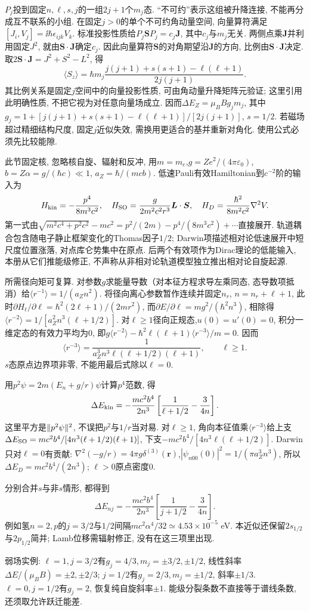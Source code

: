 $P_j$投到固定$n,\ell,s,j$的一组$2j+1$个$m_j$态. “不可约”表示这组被升降连接, 不能再分成互不联系的小组. 在固定$j>0$的单个不可约角动量空间, 向量算符满足$[J_i,V_j]=\ii\hbar\epsilon_{ijk}V_k$. 标准投影性质给$P_j\boldsymbol S P_j=c_j\boldsymbol J$, 其中$c_j$与$m_j$无关. 两侧点乘$\boldsymbol J$并利用固定$J^2$, 就由$\boldsymbol S\cdot\boldsymbol J$确定$c_j$. 因此向量算符$\boldsymbol S$的对角期望沿$\boldsymbol J$的方向, 比例由$\boldsymbol S\cdot\boldsymbol J$决定. 取$2\boldsymbol S\cdot\boldsymbol J=J^2+S^2-L^2$, 得
\[
\langle S_z\rangle=\hbar m_j
\frac{j(j+1)+s(s+1)-\ell(\ell+1)}{2j(j+1)}.
\]
其比例关系是固定$j$空间中的向量投影性质, 可由角动量升降矩阵元验证; 这里引用此明确性质, 不把它视为对任意向量场成立. 因而$\Delta E_Z=\mu_BBg_jm_j$, 其中
$g_j=1+[j(j+1)+s(s+1)-\ell(\ell+1)]/[2j(j+1)]$, $s=1/2$. 若磁场超过精细结构尺度, 固定$j$近似失效, 需换用更适合的基并重新对角化. 使用公式必须先比较能隙.

此节固定核, 忽略核自旋、辐射和反冲, 用$m=m_e$,$g=Ze^2/(4\pi\varepsilon_0)$,$b=Z\alpha=g/(\hbar c)\ll1$, $a_Z=\hbar/(mcb)$. 低速Pauli有效Hamiltonian到$c^{-2}$阶的输入为
\[
H_{\rm kin}=-\frac{p^4}{8m^3c^2},\quad
H_{\rm SO}=\frac{g}{2m^2c^2r^3}\boldsymbol L\cdot\boldsymbol S,\quad
H_D=\frac{\hbar^2}{8m^2c^2}\nabla^2V.
\]
第一式由$\sqrt{m^2c^4+p^2c^2}-mc^2=p^2/(2m)-p^4/(8m^3c^2)+\cdots$直接展开. 轨道耦合包含随电子静止框架变化的Thomas因子$1/2$; Darwin项描述相对论低速展开中短尺度位置涨落, 对点库仑势集中在原点. 后两个有效项作为Dirac理论的低能输入, 本册从它们推能级修正, 不声称从非相对论轨道模型独立推出相对论自旋起源.

所需径向矩可复算. 对参数$g$求能量导数（对本征方程求导左乘同态, 态导数项抵消）给$\langle r^{-1}\rangle=1/(a_Zn^2)$. 将径向离心参数暂作连续并固定$n_r$, $n=n_r+\ell+1$, 此时$\partial H_\ell/\partial\ell=\hbar^2(2\ell+1)/(2mr^2)$, 而$\partial E/\partial\ell=mg^2/(\hbar^2n^3)$, 相除得$\langle r^{-2}\rangle=1/[a_Z^2n^3(\ell+1/2)]$. 对$\ell\geq1$径向正规态,$u(0)=u'(0)=0$, 积分一维定态的有效力平均为0, 即$g\langle r^{-2}\rangle-\hbar^2\ell(\ell+1)\langle r^{-3}\rangle/m=0$. 因而
\[
\langle r^{-3}\rangle=\frac1{a_Z^3n^3\ell(\ell+1/2)(\ell+1)},\qquad\ell\geq1.
\]
$s$态原点边界项非零, 不能用最后式除以$\ell=0$.

用$p^2\psi=2m(E_n+g/r)\psi$计算$p^4$范数, 得
\[
\Delta E_{\rm kin}=-\frac{mc^2b^4}{2n^3}\left[\frac1{\ell+1/2}-\frac3{4n}\right].
\]
这里平方是$\lVert p^2\psi\rVert^2$, 不误把$p^2$与$1/r$当对易. 对$\ell\geq1$, 角向本征值乘$\langle r^{-3}\rangle$给上支$\Delta E_{\rm SO}=mc^2b^4/[4n^3(\ell+1/2)(\ell+1)]$, 下支$-mc^2b^4/[4n^3\ell(\ell+1/2)]$. Darwin只对$\ell=0$有贡献: $\nabla^2(-g/r)=4\pi g\delta^{(3)}(\boldsymbol r)$,$|\psi_{n00}(0)|^2=1/(\pi a_Z^3n^3)$, 所以$\Delta E_D=mc^2b^4/(2n^3)$; $\ell>0$原点密度0.

分别合并$s$与非$s$情形, 都得到
\[
\Delta E_{nj}=-\frac{mc^2b^4}{2n^3}\left[\frac1{j+1/2}-\frac3{4n}\right].
\]
例如氢$n=2,p$的$j=3/2$与$1/2$间隔$mc^2\alpha^4/32\simeq4.53\times10^{-5}$ eV. 本近似还保留$2s_{1/2}$与$2p_{1/2}$简并; Lamb位移需辐射修正, 没有在这三项里出现.

弱场实例: $\ell=1,j=3/2$有$g_j=4/3,m_j=\pm3/2,\pm1/2$, 线性斜率$\Delta E/(\mu_BB)=\pm2,\pm2/3$; $j=1/2$有$g_j=2/3,m_j=\pm1/2$, 斜率$\pm1/3$. $\ell=0,j=1/2$有$g_j=2$, 恢复纯自旋斜率$\pm1$. 能级分裂条数不直接等于谱线条数, 还须取允许跃迁能差.
